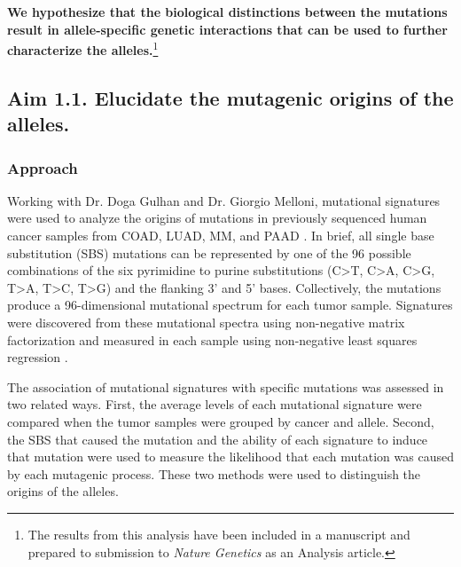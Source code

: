 \textbf{We hypothesize that the biological distinctions between the \KRAS{} mutations result in allele-specific genetic interactions that can be used to further characterize the \KRAS{} alleles.}\footnote{The results from this analysis have been included in a manuscript and prepared to submission to \emph{Nature Genetics} as an Analysis article.}




\subsection*{Aim 1.1. Elucidate the mutagenic origins of the \KRAS{} alleles.}


\subsubsection*{Approach}

Working with Dr. Doga Gulhan and Dr. Giorgio Melloni, mutational signatures \cite{Alexandrov2013DecipheringCancer., Alexandrov2013, Alexandrov2020TheCancer.} were used to analyze the origins of \KRAS{} mutations in previously sequenced human cancer samples from COAD, LUAD, MM, and PAAD \cite{CancerGenomeAtlasNetwork2012, CancerGenomeAtlasResearchNetwork2014, CancerGenomeAtlasResearchNetwork.Electronicaddress:andrew_aguirredfci.harvard.edu2017, Scarlett2011, Walker2019AAnalysis.}.
In brief, all single base substitution (SBS) mutations can be represented by one of the 96 possible combinations of the six pyrimidine to purine substitutions (C>T, C>A, C>G, T>A, T>C, T>G) and the flanking 3’ and 5’ bases.
Collectively, the mutations produce a 96-dimensional mutational spectrum for each tumor sample.
Signatures were discovered from these mutational spectra using non-negative matrix factorization and measured in each sample using non-negative least squares regression \cite{Alexandrov2013DecipheringCancer., Alexandrov2013}.

The association of mutational signatures with specific \KRAS{} mutations was assessed in two related ways.
First, the average levels of each mutational signature were compared when the tumor samples were grouped by cancer and \KRAS{} allele.
Second, the SBS that caused the \KRAS{} mutation and the ability of each signature to induce that mutation were used to measure the likelihood that each \KRAS{} mutation was caused by each mutagenic process.
These two methods were used to distinguish the origins of the \KRAS{} alleles.


